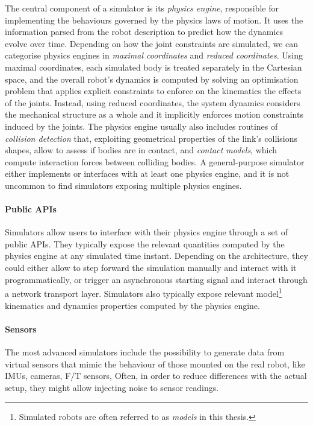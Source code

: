 \begin{addmargin}{0cm}
The central component of a simulator is its \emph{physics engine}, responsible for implementing the behaviours governed by the physics laws of motion.
It uses the information parsed from the robot description to predict how the dynamics evolve over time.
Depending on how the joint constraints are simulated, we can categorise physics engines in \emph{maximal coordinates} and \emph{reduced coordinates}.
Using maximal coordinates, each simulated body is treated separately in the Cartesian space, and the overall robot's dynamics is computed by solving an optimisation problem that applies explicit constraints to enforce on the kinematics the effects of the joints.
Instead, using reduced coordinates, the system dynamics considers the mechanical structure as a whole and it implicitly enforces motion constraints induced by the joints.
The physics engine usually also includes routines of \emph{collision detection} that, exploiting geometrical properties of the link's collisions shapes, allow to assess if bodies are in contact, and \emph{contact models}, which compute interaction forces between colliding bodies.
A general-purpose simulator either implements or interfaces with at least one physics engine, and it is not uncommon to find simulators exposing multiple physics engines.

\paragraph{Public APIs}

Simulators allow users to interface with their physics engine through a set of public \acp{API}.
They typically expose the relevant quantities computed by the physics engine at any simulated time instant.
Depending on the architecture, they could either allow to step forward the simulation manually and interact with it programmatically, or trigger an asynchronous starting signal and interact through a network transport layer.
Simulators also typically expose relevant model\footnote{Simulated robots are often referred to as \emph{models} in this thesis.} kinematics and dynamics properties computed by the physics engine.

\paragraph{Sensors}

The most advanced simulators include the possibility to generate data from virtual sensors that mimic the behaviour of those mounted on the real robot, like \acp{IMU}, cameras, \ac{F/T} sensors, \etc
Often, in order to reduce differences with the actual setup, they might allow injecting noise to sensor readings.


\end{addmargin}
